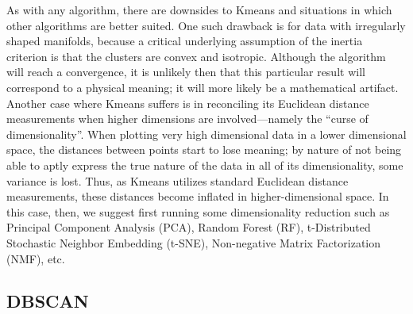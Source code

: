 \documentclass[fleqn,usenatbib,useAMS]{mnras}
\begin{document}
As with any algorithm, there are downsides to Kmeans and situations in which other algorithms are better suited. One such drawback is for data with irregularly shaped manifolds, because a critical underlying assumption of the inertia criterion is that the clusters are convex and isotropic. Although the algorithm will reach a convergence, it is unlikely then that this particular result will correspond to a physical meaning; it will more likely be a mathematical artifact. Another case where Kmeans suffers is in reconciling its Euclidean distance measurements when higher dimensions are involved---namely the ``curse of dimensionality''. When plotting very high dimensional data in a lower dimensional space, the distances between points start to lose meaning; by nature of not being able to aptly express the true nature of the data in all of its dimensionality, some variance is lost. Thus, as Kmeans utilizes standard Euclidean distance measurements, these distances become inflated in higher-dimensional space. In this case, then, we suggest first running some dimensionality reduction such as Principal Component Analysis (PCA), Random Forest (RF), t-Distributed Stochastic Neighbor Embedding (t-SNE), Non-negative Matrix Factorization (NMF), etc. \par

\subsection{DBSCAN}
\end{document}
